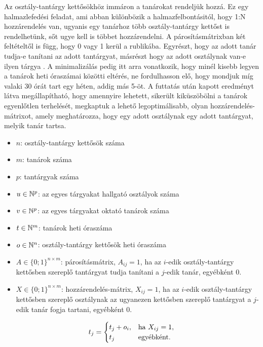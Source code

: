 
Az osztály-tantárgy kettősökhöz immáron a tanárokat rendeljük hozzá. Ez egy halmazlefedési feladat, ami abban különbözik a halmazfelbontásitól, hogy 1:N hozzárendelés van, ugyanis egy tanárhoz több osztály-tantárgy kettőst is rendelhetünk, sőt ugye kell is többet hozzárendelni. A párosításmátrixban két feltételtől is függ, hogy 0 vagy 1 kerül a rublikába. Egyrészt, hogy az adott tanár tudja-e tanítani az adott tantárgyat, másrészt hogy az adott osztálynak van-e ilyen tárgya \cite{nagy1998operaciokutatas}. A minimalizálás pedig itt arra vonatkozik, hogy minél kisebb legyen a tanárok heti óraszámai közötti eltérés, ne fordulhasson elő, hogy mondjuk míg valaki 30 órát tart egy héten, addig más 5-öt.
A futtatás után kapott eredményt látva megállapítható, hogy amennyire lehetett, sikerült kiküszöbölni a tanárok egyenlőtlen terhelését, megkaptuk a lehető legoptimálisabb, olyan hozzárendelés-mátrixot, amely meghatározza, hogy egy adott osztálynak egy adott tantárgyat, melyik tanár tartsa.


\begin{itemize}
	\item $n$: osztály-tantárgy kettősök száma
	\item $m$: tanárok száma
	\item $p$: tantárgyak száma
	\item $u \in \Bbb{N}^p$: az egyes tárgyakat hallgató osztályok száma
	\item $v \in \Bbb{N}^p$: az egyes tárgyakat oktató tanárok száma
	\item $t \in \Bbb{N}^m$: tanárok heti óraszáma
	\item $o \in \Bbb{N}^n$: osztály-tantárgy kettősök heti óraszáma
	\item $A \in \{0;1\}^{n \times m}$: párosításmátrix, $A_{ij} = 1$, ha az $i$-edik osztály-tantárgy kettősben szereplő tantárgyat tudja tanítani a $j$-edik tanár, egyébként 0.
	\item $X \in \{0;1\}^{n \times m}$: hozzárendelés-mátrix, $X_{ij} = 1$, ha az $i$-edik osztály-tantárgy kettősben szereplő osztálynak az ugyanezen kettősben szereplő tantárgyat a $j$-edik tanár fogja tartani, egyébként 0.
\end{itemize}

\[
t_{j} =
\begin{cases}
t_j+o_i,& \hbox{ha } X_{ij}=1, \\
t_j & \hbox{egyébként}.
\end{cases}
\]

